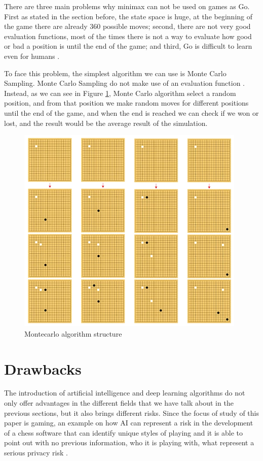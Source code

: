 \documentclass[conference]{IEEEtran}
\begin{document}
There are three main problems why minimax can not be used on games as Go. First as stated in the section before, the state space is huge, at the beginning of the game there are already 360 possible moves; second, there are not very good evaluation functions, most of the times there is not a way to evaluate how good or bad a position is until the end of the game; and third, Go is difficult to learn even for humans \cite{alphatoe}.

To face this problem, the simplest algorithm we can use is Monte Carlo Sampling. Monte Carlo Sampling do not make use of an evaluation function \cite{alphatoe}. Instead, as we can see in Figure \ref{chess:montecarlo}, Monte Carlo algorithm select a random position, and from that position we make random moves for different positions until the end of the game, and when the end is reached we can check if we won or lost, and the result would be the average result of the simulation.

\begin{figure}[!h]
\centering
\includegraphics[scale=0.55]{img/montecarlo.png}
\caption{Montecarlo algorithm structure}
\label{chess:montecarlo}
\end{figure}

\section{Drawbacks}

The introduction of artificial intelligence and deep learning algorithms do not only offer advantages in the different fields that we have talk about in the previous sections, but it also brings different risks. Since the focus of study of this paper is gaming, an example on how AI can represent a risk in the development of a chess software that can identify unique styles of playing and it is able to point out with no previous information, who it is playing with, what represent a serious privacy risk \cite{unmask}.
\end{document}
